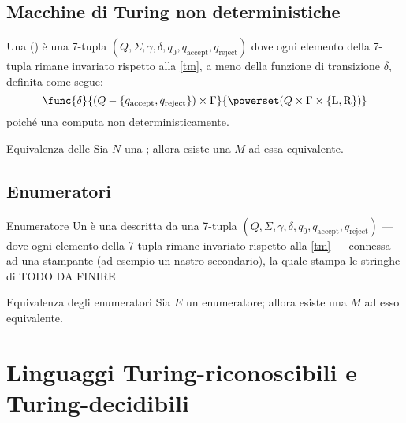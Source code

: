 \documentclass[a4paper, 12pt]{report}
\begin{document}
    \subsection{Macchine di Turing non deterministiche}

    \begin{frameddefn}{\NTM}
        Una \tbf{\NTM} () è una 7-tupla $(Q, \Sigma, \gamma, \delta, q_0, q_\mathrm{accept}, q_\mathrm{reject})$ dove ogni elemento della 7-tupla rimane invariato rispetto alla \cref{tm}, a meno della funzione di transizione $\delta$, definita come segue: $$\func{\delta}{(Q-\{q_\mathrm{accept}, q_\mathrm{reject}\}) \times \Gamma}{\powerset(Q \times \Gamma \times \{ \mathrm L, \mathrm R\})}$$ poiché una \NTM computa non deterministicamente.
    \end{frameddefn}

    \begin{framedprop}[label={ntm tm}]{Equivalenza delle \NTM}
        Sia $N$ una \NTM; allora esiste una \TM $M$ ad essa equivalente.
    \end{framedprop}


    \subsection{Enumeratori}

    \begin{frameddefn}{Enumeratore}
        Un  è una \TM descritta da una 7-tupla $(Q, \Sigma, \gamma, \delta, q_0, q_\mathrm{accept}, q_\mathrm{reject})$ --- dove ogni elemento della 7-tupla rimane invariato rispetto alla \cref{tm} --- connessa ad una stampante (ad esempio un nastro secondario), la quale stampa le stringhe di TODO DA FINIRE
    \end{frameddefn}

    \begin{framedprop}{Equivalenza degli enumeratori}
        Sia $E$ un enumeratore; allora esiste una \TM $M$ ad esso equivalente.
    \end{framedprop}

  
    \section{Linguaggi Turing-riconoscibili e Turing-decidibili}
\end{document}
